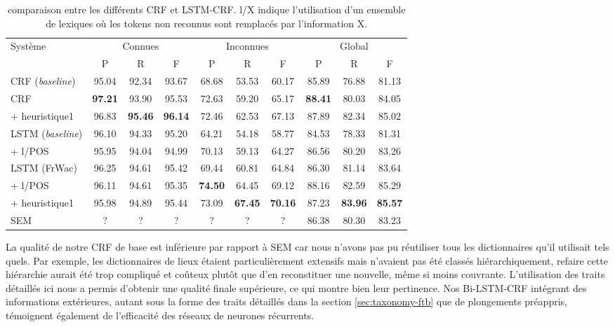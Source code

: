 \documentclass[citation\_needed]{subfiles}
\begin{document}
\begin{table}[ht!]
\centering
\small
\begin{tabular}{|l|ccc|ccc|ccc|}
\hline
\multirow{2}{*}{Système}   & \multicolumn{3}{c|}{Connues} & \multicolumn{3}{c|}{Inconnues} & \multicolumn{3}{c|}{Global}\\
                           & P     & R     & F          & P     & R     & F             & P     & R     & F   \\
\hline
CRF (\emph{baseline})      & 95.04 & 92.34 & 93.67 & 68.68 & 53.53 & 60.17 & 85.89 & 76.88 & 81.13 \\
CRF                        & \textbf{97.21} & 93.90 & 95.53 & 72.63 & 59.20 & 65.17 & \textbf{88.41} & 80.03 & 84.05 \\
+ heuristique1             & 96.83 & \textbf{95.46} & \textbf{96.14} & 72.46 & 62.53 & 67.13 & 87.89 & 82.34 & 85.02 \\
\hline
LSTM (\emph{baseline}) & 96.10 & 94.33 & 95.20 & 64.21 & 54.18 & 58.77 & 84.53 & 78.33 & 81.31 \\
+ l/POS                    & 95.95 & 94.04 & 94.99 & 70.13 & 59.13 & 64.27 & 86.56 & 80.20 & 83.26 \\
LSTM (FrWac)           & 96.25 & 94.61 & 95.42 & 69.44 & 60.81 & 64.84 & 86.30 & 81.14 & 83.64 \\
+ l/POS                    & 96.11 & 94.61 & 95.35 & \textbf{74.50} & 64.45 & 69.12 & 88.16 & 82.59 & 85.29 \\
+ heuristique1             & 95.98 & 94.89 & 95.44 & 73.09 & \textbf{67.45} & \textbf{70.16} & 87.23 & \textbf{83.96} & \textbf{85.57} \\
\hline
SEM & ? & ? & ? & ? & ? & ? & 86.38 & 80.30 & 83.23 \\
\hline
\end{tabular}
\caption{comparaison entre les différents CRF et LSTM-CRF. l/X indique l'utilisation d'un ensemble de lexiques où les tokens non reconnus sont remplacés par l'information X.}
\label{tab:CRF-vs-LSTM-vs-SEM}
\end{table}

La qualité de notre CRF de base est inférieure par rapport à SEM \citep{dupont2014reconnaisseur} car nous n'avons pas pu réutiliser tous les dictionnaires qu'il utilisait tels quels. Par exemple, les dictionnaires de lieux étaient particulièrement extensifs mais n'avaient pas été classés hiérarchiquement, refaire cette hiérarchie aurait été trop compliqué et coûteux plutôt que d'en reconstituer une nouvelle, même si moins couvrante. L'utilisation des traits détaillés ici nous a permis d'obtenir une qualité finale supérieure, ce qui montre bien leur pertinence. Nos Bi-LSTM-CRF intégrant des informations extérieures, autant sous la forme des traits détaillés dans la section \ref{sec:taxonomy-ftb} que de plongements préappris, témoignent également de l'efficacité des réseaux de neurones récurrents.
\end{document}
